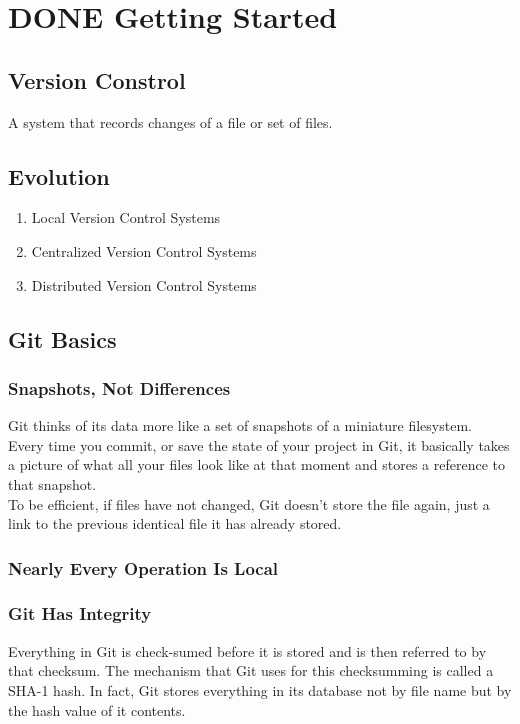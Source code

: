 \documentclass[11pt]{article}
\author{Mingming Li}
\date{\today}
\title{}
\begin{document}
\tableofcontents

\section{{\bfseries\sffamily DONE} Getting Started}
\label{sec:org6dbc28c}
\subsection{Version Constrol}
\label{sec:org907cdb0}
A system that records changes of a file or set of files.\\
\subsection{Evolution}
\label{sec:org3e83215}
\begin{enumerate}
\item Local Version Control Systems\\
\item Centralized Version Control Systems\\
\item Distributed Version Control Systems\\
\end{enumerate}


\subsection{Git Basics}
\label{sec:org369b067}
\subsubsection{Snapshots, Not Differences}
\label{sec:org75b66ea}
Git thinks of its data more like a set of snapshots of a miniature filesystem. Every time you commit, or save the state of your project in Git, it basically takes a picture of what all your files look like at that moment and stores a reference to that snapshot.\\
To be efficient, if files have not changed, Git doesn't store the file again, just a link to the previous identical file it has already stored.\\

\subsubsection{Nearly Every Operation Is Local}
\label{sec:orgac383b4}

\subsubsection{Git Has Integrity}
\label{sec:orgdb40209}
Everything in Git is check-sumed before it is stored and is then referred to by that checksum. The mechanism that Git uses for this checksumming is called a SHA-1 hash. In fact, Git stores everything in its database not by file name but by the hash value of it contents.\\
\end{document}
